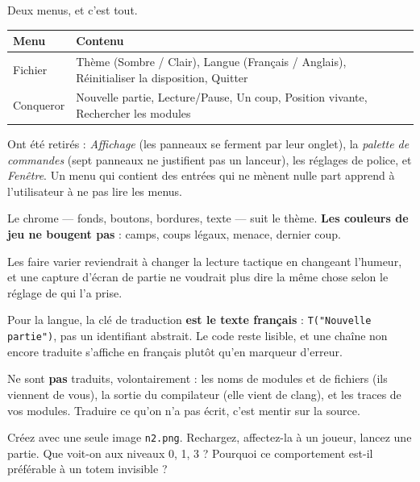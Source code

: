 Deux menus, et c'est tout.

\begin{center}
\begin{tabular}{@{}p{2.6cm}p{11.2cm}@{}}
\toprule
\textbf{Menu} & \textbf{Contenu} \\
\midrule
Fichier & Thème (Sombre / Clair), Langue (Français / Anglais), Réinitialiser la disposition, Quitter \\
Conqueror & Nouvelle partie, Lecture/Pause, Un coup, Position vivante, Rechercher les modules \\
\bottomrule
\end{tabular}
\end{center}

Ont été retirés : \emph{Affichage} (les panneaux se ferment par leur onglet), la
\emph{palette de commandes} (sept panneaux ne justifient pas un lanceur), les
réglages de police, et \emph{Fenêtre}. Un menu qui contient des entrées qui ne
mènent nulle part apprend à l'utilisateur à ne pas lire les menus.

\begin{nkretenir}
Le chrome — fonds, boutons, bordures, texte — suit le thème. \textbf{Les couleurs
de jeu ne bougent pas} : camps, coups légaux, menace, dernier coup.

Les faire varier reviendrait à changer la lecture tactique en changeant l'humeur,
et une capture d'écran de partie ne voudrait plus dire la même chose selon le
réglage de qui l'a prise.
\end{nkretenir}

Pour la langue, la clé de traduction \textbf{est le texte français} :
\texttt{T("Nouvelle partie")}, pas un identifiant abstrait. Le code reste
lisible, et une chaîne non encore traduite s'affiche en français plutôt qu'en
marqueur d'erreur.

Ne sont \textbf{pas} traduits, volontairement : les noms de modules et de fichiers
(ils viennent de vous), la sortie du compilateur (elle vient de clang), et les
traces de vos modules. Traduire ce qu'on n'a pas écrit, c'est mentir sur la
source.

\begin{nkexo}
Créez  avec une seule image \texttt{n2.png}.
Rechargez, affectez-la à un joueur, lancez une partie. Que voit-on aux niveaux 0,
1, 3 ? Pourquoi ce comportement est-il préférable à un totem invisible ?
\end{nkexo}

